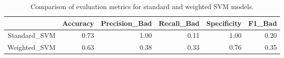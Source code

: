 \begin{table}[ht]
\centering
\begin{tabular}{rrrrrr}
  \hline
 & Accuracy & Precision\_Bad & Recall\_Bad & Specificity & F1\_Bad \\ 
  \hline
Standard\_SVM & 0.73 & 1.00 & 0.11 & 1.00 & 0.20 \\ 
  Weighted\_SVM & 0.63 & 0.38 & 0.33 & 0.76 & 0.35 \\ 
   \hline
\end{tabular}
\caption{Comparison of evaluation metrics for standard and weighted SVM models.} 
\label{tab:svm_metrics}
\end{table}
